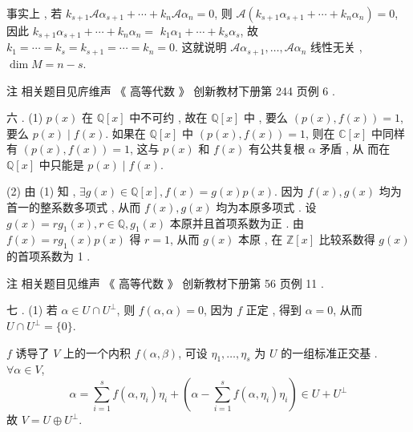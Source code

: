 \documentclass[10pt]{article}
\begin{document}
 事实上 ,  若  $k_{s+1} \mathscr{A} \alpha_{s+1}+\cdots+k_{n} \mathscr{A} \alpha_{n}=0$,  则  $\mathscr{A}\left(k_{s+1} \alpha_{s+1}+\cdots+k_{n} \alpha_{n}\right)=0$,  因此  $k_{s+1} \alpha_{s+1}+\cdots+k_{n} \alpha_{n}=$ $k_{1} \alpha_{1}+\cdots+k_{s} \alpha_{s}$,  故  $k_{1}=\cdots=k_{s}=k_{s+1}=\cdots=k_{n}=0$.  这就说明  $\mathscr{A} \alpha_{s+1}, \ldots, \mathscr{A} \alpha_{n}$  线性无关 , $\operatorname{dim} M=n-s$.

 注   相关题目见庍维声 《 高等代数 》 创新教材下册第  244  页例  6 .

 六 . (1) $p(x)$  在  $\mathbb{Q}[x]$  中不可约 ,  故在  $\mathbb{Q}[x]$  中 ,  要么  $(p(x), f(x))=1$,  要么  $p(x) \mid f(x)$.  如果在  $\mathbb{Q}[x]$  中  $(p(x), f(x))=1$,  则在  $\mathbb{C}[x]$  中同样有  $(p(x), f(x))=1$,  这与  $p(x)$  和  $f(x)$  有公共复根  $\alpha$  矛盾 ,  从   而在  $\mathbb{Q}[x]$  中只能是  $p(x) \mid f(x)$.

(2)  由  (1)  知 , $\exists g(x) \in \mathbb{Q}[x], f(x)=g(x) p(x)$.  因为  $f(x), g(x)$  均为首一的整系数多项式 ,  从而  $f(x), g(x)$  均为本原多项式 .  设  $g(x)=r g_{1}(x), r \in \mathbb{Q}, g_{1}(x)$  本原并且首项系数为正 .  由  $f(x)=r g_{1}(x) p(x)$  得  $r=1$,  从而  $g(x)$  本原 ,  在  $\mathbb{Z}[x]$  比较系数得  $g(x)$  的首项系数为  1 .

 注   相关题目见维声 《 高等代数 》 创新教材下册第  56  页例  11 .

 七 . (1)  若  $\alpha \in U \cap U^{\perp}$,  则  $f(\alpha, \alpha)=0$,  因为  $f$  正定 ,  得到  $\alpha=0$,  从而  $U \cap U^{\perp}=\{0\}$.

$f$  诱导了  $V$  上的一个内积  $f(\alpha, \beta)$,  可设  $\eta_{1}, \ldots, \eta_{s}$  为  $U$  的一组标准正交基 . $\forall \alpha \in V$,
$$
\alpha=\sum_{i=1}^{s} f\left(\alpha, \eta_{i}\right) \eta_{i}+\left(\alpha-\sum_{i=1}^{s} f\left(\alpha, \eta_{i}\right) \eta_{i}\right) \in U+U^{\perp}
$$
 故  $V=U \oplus U^{\perp}$.
\end{document}
